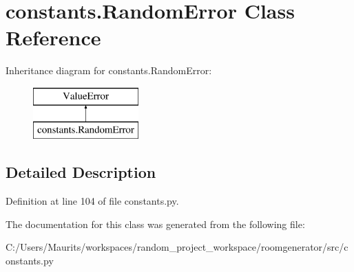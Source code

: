 \hypertarget{classconstants_1_1_random_error}{}\section{constants.\+Random\+Error Class Reference}
\label{classconstants_1_1_random_error}
Inheritance diagram for constants.\+Random\+Error\+:\begin{figure}[H]
\begin{center}
\leavevmode
\includegraphics[height=2.000000cm]{classconstants_1_1_random_error}
\end{center}
\end{figure}


\subsection{Detailed Description}


Definition at line 104 of file constants.\+py.



The documentation for this class was generated from the following file\+:\begin{DoxyCompactItemize}
\item 
C\+:/\+Users/\+Maurits/workspaces/random\+\_\+project\+\_\+workspace/roomgenerator/src/constants.\+py\end{DoxyCompactItemize}
